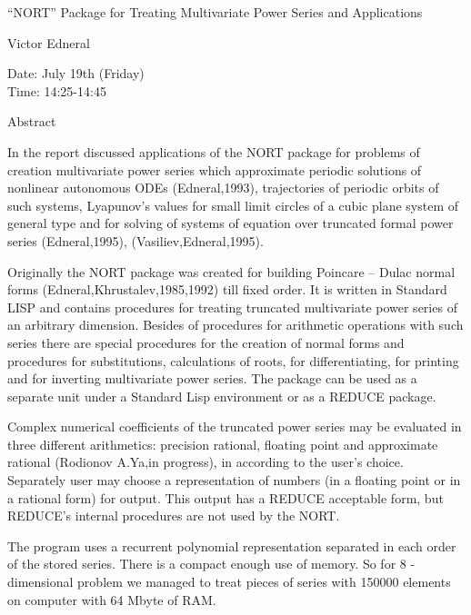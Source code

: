 \begin{center}
\LARGE
``NORT'' Package for Treating Multivariate Power Series
                        and Applications

\end{center}

\begin{center}
\Large
Victor Edneral

\end{center}

\noindent
Date:  July 19th (Friday)\\
Time:  14:25-14:45\\

\begin{center}
\large
Abstract
\end{center}

In the report discussed applications of the NORT package for problems of creation multivariate
power series which approximate periodic solutions of nonlinear autonomous ODEs
(Edneral,1993), trajectories of periodic orbits of such systems, Lyapunov's values for small limit
circles of a cubic plane system of general type and for solving of systems of equation over
truncated formal power series (Edneral,1995), (Vasiliev,Edneral,1995). 

Originally the NORT package was created for building Poincare -- Dulac normal forms
(Edneral,Khrustalev,1985,1992) till fixed order. It is written in Standard LISP and contains
procedures for treating truncated multivariate power series of an arbitrary dimension. Besides of
procedures for arithmetic operations with such series there are special procedures for the creation
of normal forms and procedures for substitutions, calculations of roots, for differentiating, for
printing and for inverting multivariate power series. The package can be used as a separate unit
under a Standard Lisp environment or as a REDUCE package. 

Complex numerical coefficients of the truncated power series may be evaluated in three different
arithmetics: precision rational, floating point and approximate rational (Rodionov A.Ya,in
progress), in according to the user's choice. Separately user may choose a representation of
numbers (in a floating point or in a rational form) for output. This output has a REDUCE
acceptable form, but REDUCE's internal procedures are not used by the NORT. 

The program uses a recurrent polynomial representation separated in each order of the stored
series. There is a compact enough use of memory. So for 8 - dimensional problem we managed to
treat pieces of series with 150000 elements on computer with 64 Mbyte of RAM. 

